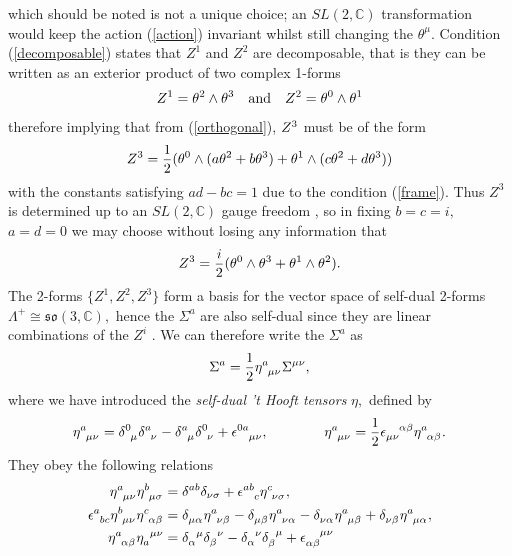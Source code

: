\documentclass[a4paper,12pt, onecolumn, notitlepage]{article}
\theoremstyle{definition}
\theoremstyle{remark}
\newcommand{\al}{\alpha}
\newcommand{\m}{\mu}
\newcommand{\n}{\nu}
\newcommand{\e}{\epsilon}
\newcommand{\hooft}[3]{\eta\indices{^{#1}_{#2}_{#3}}}
\begin{document}
which should be noted is not a unique choice; an $SL(2,\mathbb{C})$ transformation would keep the action (\ref{action}) invariant whilst still changing the $\theta^{\m}.$ Condition (\ref{decomposable}) states that $Z^{1}$ and $Z^{2}$ are decomposable, that is they can be written as an exterior product of two complex 1-forms
\begin{align*}
	Z\indices{^1}=\theta\indices{^2}\wedge\theta\indices{^3}\quad\text{and}\quad
	Z\indices{^2}=\theta\indices{^0}\wedge\theta\indices{^1}
\end{align*}
therefore implying that from (\ref{orthogonal}),  $Z\indices{^3}$ must be of the form
\begin{equation*}
\label{z1z2}
	Z\indices{^3}=\frac{1}{2}(\theta\indices{^0}\wedge(a\theta\indices{^2} + b\theta\indices{^3}) + \theta\indices{^1}\wedge(c\theta{^2} + d\theta\indices{^3}))
\end{equation*}
with the constants satisfying $ad-bc=1$ due to the condition (\ref{frame}). Thus $Z^{3}$ is determined up to an $SL(2,\mathbb{C})$ gauge freedom \cite{plebanski_1975}, so in fixing $b=c=i,$ $a=d=0$ we may choose without losing any information that
\begin{equation*}
\label{z3}
	Z\indices{^3}=\frac{i}{2}(\theta\indices{^0}\wedge\theta\indices{^3} + \theta\indices{^1}\wedge\theta\indices{^2}).
\end{equation*}
The 2-forms $\{Z^{1},Z^{2}, Z^{3}\}$ form a basis for the vector space of self-dual 2-forms $\Lambda^{+}\cong \mathfrak{so}(3,\mathbb{C}),$ hence the $\Sigma^{a}$ are also self-dual since they are linear combinations of the $Z^{i}$ \cite{cahen_1967}. We can therefore write the $\Sigma^{a}$ as 
\begin{equation}
\Sigma^{a} =  \frac{1}{2}\hooft{a}{\mu}{\n}\Sigma\indices{^\m^\n},
\end{equation}
where we have introduced the \emph{self-dual 't Hooft tensors} $\eta,$ defined by
\begin{equation}
	\label{hooft1}
	\hooft{a}{\m}{\n} =  \delta\indices{^0_\mu}\delta\indices{^a_\nu} - \delta\indices{^a_\mu}\delta\indices{^0_\nu} + \epsilon\indices{^0^a_\mu_\nu},\qquad\qquad\hooft{a}{\m}{\n}=\frac{1}{2}\e\indices{_\m_\n^\al^\beta}\hooft{a}{\al}{\beta}.\\
\end{equation}
They obey the following relations
\begin{subequations}
	\begin{align}
	\label{hooft2}
	\hooft{a}{\m}{\n}\hooft{b}{\m}{\sigma} &= \delta^{ab}\delta_{\nu\sigma} + \epsilon\indices{^a^b_c}\hooft{c}{\nu}{\sigma},\\
	\label{hooft3}
	\e\indices{^a_b_c}\hooft{b}{\m}{\n}\hooft{c}{\al}{\beta}&=\delta\indices{_\m_\al}\hooft{a}{\n}{\beta}-\delta\indices{_\m_\beta}\hooft{a}{\n}{\al}-\delta\indices{_\n_\al}\hooft{a}{\m}{\beta}+\delta\indices{_\n_\beta}\hooft{a}{\m}{\al},\\
	\label{projection}
	\hooft{a}{\al}{\beta}\eta\indices{_{a}^{\mu}^{\nu}} &= \delta\indices{_\al^\mu}\delta\indices{_\beta^\nu} - \delta\indices{_\al^\nu}\delta\indices{_\beta^\mu} + \e\indices{_\al_\beta^\mu^\nu}
	\end{align}
\end{subequations}
\end{document}

